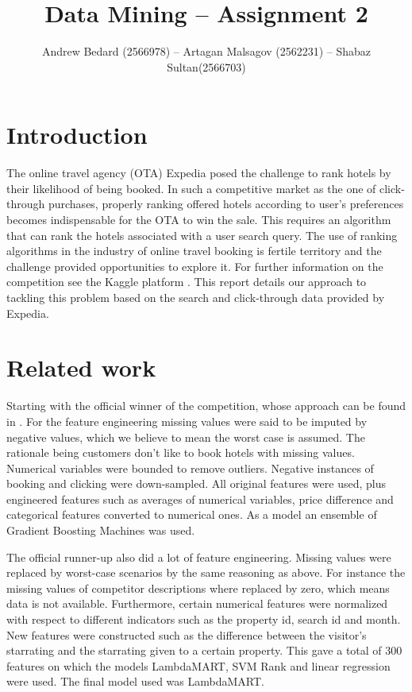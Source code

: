 \documentclass{llncs}
\title{Data Mining -- Assignment 2}
\author{Andrew Bedard (2566978) -- Artagan Malsagov (2562231)  -- Shabaz Sultan(2566703)}
\institute{}
\begin{document}
\maketitle
\section{Introduction}
The online travel agency (OTA) Expedia posed the challenge to rank hotels by their likelihood of being booked. In such a competitive market as the one of click-through purchases, properly ranking offered hotels according to user's preferences becomes indispensable for the OTA to win the sale. This requires an algorithm that can rank the hotels associated with a user search query. The use of ranking algorithms in the industry of online travel booking is fertile territory and the challenge provided opportunities to explore it. For further information on the competition see the Kaggle platform \cite{WinNT}. This report details our approach to tackling this problem based on the search and click-through data provided by Expedia. 

\section{Related work}
Starting with the official winner of the competition, whose approach can be found in \cite{Zhang2013}. For the feature engineering missing values were said to be imputed by negative values, which we believe to mean the worst case is assumed. The rationale being customers don't like to book hotels with missing values. Numerical variables were bounded to remove outliers. Negative instances of booking and clicking were down-sampled. All original features were used, plus engineered features such as averages of numerical variables, price difference and categorical features converted to numerical ones. As a model an ensemble of Gradient Boosting Machines was used. 

The official runner-up also did a lot of feature engineering. Missing values were replaced by worst-case scenarios by the same reasoning as above. For instance the missing values of competitor descriptions where replaced by zero, which means data is not available. Furthermore, certain numerical features were normalized with respect to different indicators such as the property id, search id and month. New features were constructed such as the difference between the visitor's starrating and the starrating given to a certain property. This gave a total of 300 features on which the models LambdaMART, SVM Rank and linear regression were used. The final model used was LambdaMART.
\end{document}
